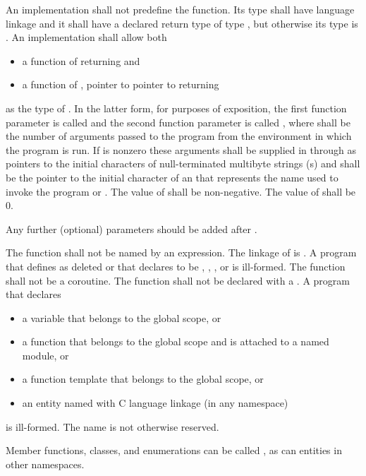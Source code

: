 \pnum
An implementation shall not predefine the  function.
Its type shall have \Cpp{} language linkage
and it shall have a declared return type of type
, but otherwise its type is .
%
An implementation shall allow both
\begin{itemize}
\item a function of \tcode{()} returning  and
\item a function of , pointer to pointer to  returning 
\end{itemize}
%
%
as the type of .
%
%
In the latter form, for purposes of exposition, the first function
parameter is called  and the second function parameter is
called , where  shall be the number of
arguments passed to the program from the environment in which the
program is run. If
 is nonzero these arguments shall be supplied in
 through  as pointers to the initial
characters of null-terminated multibyte strings (\ntmbs{}s)
and  shall be the pointer to
the initial character of an \ntmbs{} that represents the name used to
invoke the program or . The value of  shall be
non-negative. The value of  shall be 0.

\recommended
Any further (optional) parameters should be added after .

\pnum
The function  shall not be named by an expression.
%
The linkage of  is
. A program that defines  as
deleted or that declares  to be
, , , or  is ill-formed.
The function  shall not be a coroutine.
The  function shall not be declared with a
.
A program that declares
\begin{itemize}
\item
a variable  that belongs to the global scope, or
\item
a function  that belongs to the global scope and
is attached to a named module, or
\item
a function template  that belongs to the global scope, or
\item
an entity named 
with C language linkage (in any namespace)
\end{itemize}
is ill-formed.
The name  is
not otherwise reserved.
\begin{example}
Member functions, classes, and
enumerations can be called , as can entities in other
namespaces.
\end{example}

